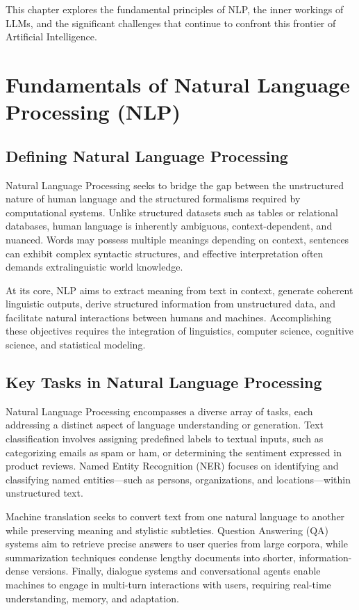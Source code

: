 \documentclass[openany]{book}
\begin{document}
This chapter explores the fundamental principles of NLP, the inner workings of 
LLMs, and the significant challenges that continue to confront this frontier of 
Artificial Intelligence.

\section{Fundamentals of Natural Language Processing (NLP)}

\subsection{Defining Natural Language Processing}

Natural Language Processing seeks to bridge the gap between the unstructured 
nature of human language and the structured formalisms required by computational 
systems. Unlike structured datasets such as tables or relational databases, 
human language is inherently ambiguous, context-dependent, and nuanced. Words 
may possess multiple meanings depending on context, sentences can exhibit 
complex syntactic structures, and effective interpretation often demands 
extralinguistic world knowledge.

At its core, NLP aims to extract meaning from text in context, generate coherent 
linguistic outputs, derive structured information from unstructured data, and 
facilitate natural interactions between humans and machines. Accomplishing these 
objectives requires the integration of linguistics, computer science, cognitive 
science, and statistical modeling.

\subsection{Key Tasks in Natural Language Processing}

Natural Language Processing encompasses a diverse array of tasks, each 
addressing a distinct aspect of language understanding or generation. Text 
classification involves assigning predefined labels to textual inputs, such as 
categorizing emails as spam or ham, or determining the sentiment expressed in 
product reviews. Named Entity Recognition (NER) focuses on identifying and 
classifying named entities---such as persons, organizations, and 
locations---within unstructured text.

Machine translation seeks to convert text from one natural language to another 
while preserving meaning and stylistic subtleties. Question Answering (QA) 
systems aim to retrieve precise answers to user queries from large corpora, 
while summarization techniques condense lengthy documents into shorter, 
information-dense versions. Finally, dialogue systems and conversational agents 
enable machines to engage in multi-turn interactions with users, requiring 
real-time understanding, memory, and adaptation.
\end{document}
